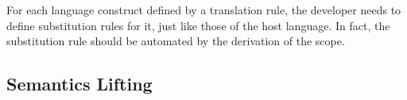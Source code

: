 



For each language construct defined by a translation rule,
 the developer needs to define substitution rules for it,
 just like those of the host language.
 In fact, the substitution rule should be automated by the derivation of the scope.

\subsection{Semantics Lifting}


